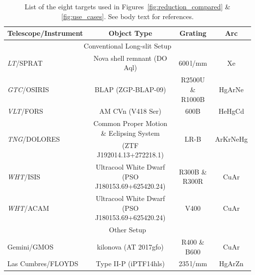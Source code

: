 \documentclass[linenumbers, twocolumn]{aastex631}
\begin{document}
\begin{table}
    \begin{tabular}{l|c|c|c}\hline
        Telescope/Instrument & Object Type                                 & Grating             & Arc \\\hline\hline
        \multicolumn{4}{c}{Conventional Long-slit Setup}\\\hline
        \textit{LT}/SPRAT      & Nova shell remnant (DO Aql)                 & 600\,l/mm           & Xe \\
        \textit{GTC}/OSIRIS           & BLAP (ZGP-BLAP-09)                          & R2500U \& R1000B    & HgArNe \\
        \textit{VLT}/FORS             & AM CVn (V418 Ser)                           & 600B                & HeHgCd \\
        \multirow{2}{*}{\textit{TNG}/DOLORES}          & Common Proper Motion \& Eclipsing System     & \multirow{2}{*}{LR-B}                & \multirow{2}{*}{ArKrNeHg} \\
                             & (ZTF J192014.13+272218.1)     &           &  \\
        \textit{WHT}/ISIS             & Ultracool White Dwarf (PSO J180153.69+625420.24)       & R300B \& R300R      & CuAr \\
        \textit{WHT}/ACAM             & Ultracool White Dwarf (PSO J180153.69+625420.24)       & V400                & CuAr \\\hline
        \multicolumn{4}{c}{Other Setup}\\\hline
        Gemini/GMOS          & kilonova (AT 2017gfo)                       & R400 \& B600        & CuAr \\
        Las Cumbres/FLOYDS           & Type II-P (iPTF14hls)                       & 235\,l/mm           & HgArZn \\\hline
\end{tabular}
    \caption{List of the eight targets used in Figures~\ref{fig:reduction_compared} \& \ref{fig:use_cases}. See body text for references.}
    \label{tab:summary}
\end{table}
\end{document}
